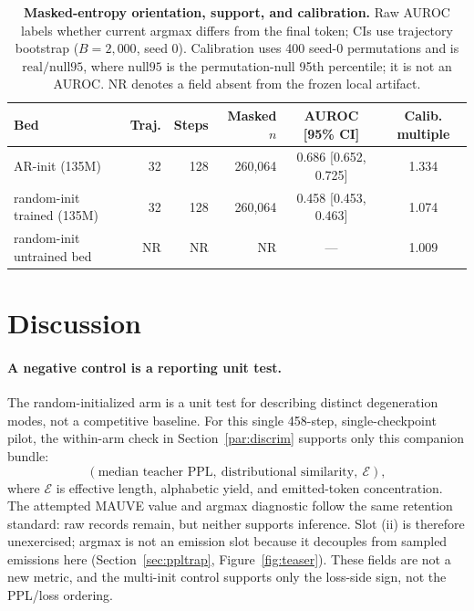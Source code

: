 \documentclass{article}
\newcommand{\armA}{AR-init}
\newcommand{\armB}{random-init}
\begin{document}
\begin{table}[!t]
  \caption{\textbf{Masked-entropy orientation, support, and calibration.}
  Raw AUROC labels whether current argmax differs from the final token; CIs use
  trajectory bootstrap ($B=2{,}000$, seed 0).  Calibration uses 400 seed-0
  permutations and is $\mathrm{real}/\mathrm{null95}$, where $\mathrm{null95}$
  is the permutation-null 95th percentile; it is not an AUROC.  NR denotes a
  field absent from the frozen local artifact.}
  \label{tab:crossbed}
  \centering
  \footnotesize
  \setlength{\tabcolsep}{3.5pt}
  \begin{tabular}{@{}lrrrcc@{}}
    \toprule
    Bed & Traj. & Steps & Masked $n$ & AUROC [95\% CI] & Calib. multiple \\
    \midrule
    \armA{} (135M) & 32 & 128 & 260{,}064 & 0.686 [0.652, 0.725] & 1.334 \\
    \armB{} trained (135M) & 32 & 128 & 260{,}064 & 0.458 [0.453, 0.463] & 1.074 \\
    \armB{} untrained bed & NR & NR & NR & --- & 1.009 \\
    \bottomrule
  \end{tabular}
\end{table}

\section{Discussion}
\label{sec:discussion}

\paragraph{A negative control is a reporting unit test.}
The random-initialized arm is a unit test for describing distinct degeneration
modes, not a competitive baseline.  For this single 458-step,
single-checkpoint pilot, the within-arm check in Section~\ref{par:discrim}
supports only this companion bundle:
\begin{equation}
  \label{eq:bundle}
  (\text{median teacher PPL},\ \text{distributional similarity},\ \mathcal{E}),
\end{equation}
where $\mathcal{E}$ is effective length, alphabetic yield, and emitted-token
concentration.  The attempted MAUVE value and argmax diagnostic follow the
same retention standard: raw records remain, but neither supports inference.
Slot (ii) is therefore unexercised; argmax is not an emission slot because it
decouples from sampled emissions here (Section~\ref{sec:ppltrap},
Figure~\ref{fig:teaser}).  These fields are not a new metric, and the
multi-init control supports only the loss-side sign, not the PPL/loss ordering.
\end{document}
